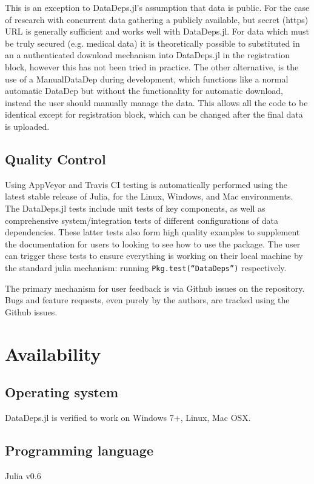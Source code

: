 \documentclass{jors}
\begin{document}
This is an exception to DataDeps.jl's assumption that data is public.
For the case of research with concurrent data gathering a publicly available, but secret (https) URL is generally sufficient and works well with DataDeps.jl.
For data which must be truly secured (e.g. medical data) it is theoretically possible to substituted in an a authenticated  download mechanism into DataDeps.jl in the registration block, however this has not been tried in practice.
The other alternative, is the use of a ManualDataDep during development, which functions like a normal automatic DataDep but without the functionality for automatic download, instead the user should manually manage the data.
This allows all the code to be identical except for registration block, which can be changed after the final data is uploaded.



\subsection{Quality Control}

Using AppVeyor and Travis CI testing is automatically performed using the latest stable release of Julia, for the Linux, Windows, and Mac environments.
The DataDeps.jl tests include unit tests of key components, as well as comprehensive system/integration tests of different configurations of data dependencies.
These latter tests also form high quality examples to supplement the documentation for users to looking to see how to use the package.
The user can trigger these tests to ensure everything is working on their local machine by the standard julia mechanism: running \texttt{Pkg.test(``DataDeps'')} respectively.


The primary mechanism for user feedback is via Github issues on the repository.
Bugs and feature requests, even purely by the authors, are tracked using the Github issues.

\section{Availability}
\subsection{Operating system}
DataDeps.jl is verified to work on Windows 7+, Linux, Mac OSX.

\subsection{Programming language}
Julia v0.6
\end{document}
